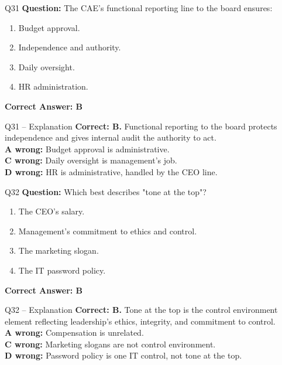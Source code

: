 \documentclass[aspectratio=169,10pt]{beamer}
\begin{document}
	\begin{frame}[t]{Q31}
		\small
		\textbf{Question:} The CAE's functional reporting line to the board ensures:
		\begin{enumerate}[label=\Alph*.,itemsep=1pt,topsep=2pt]
			\item Budget approval.
			\item Independence and authority.
			\item Daily oversight.
			\item HR administration.
		\end{enumerate}
		\vspace{4pt}
		\textbf{Correct Answer: B}
	\end{frame}
	
	\begin{frame}[t]{Q31 -- Explanation}
		\small
		\textbf{Correct: B.} Functional reporting to the board protects independence and gives internal audit the authority to act. \\[4pt]
		\textbf{A wrong:} Budget approval is administrative. \\[2pt]
		\textbf{C wrong:} Daily oversight is management's job. \\[2pt]
		\textbf{D wrong:} HR is administrative, handled by the CEO line.
	\end{frame}
	
	\begin{frame}[t]{Q32}
		\small
		\textbf{Question:} Which best describes "tone at the top"?
		\begin{enumerate}[label=\Alph*.,itemsep=1pt,topsep=2pt]
			\item The CEO's salary.
			\item Management's commitment to ethics and control.
			\item The marketing slogan.
			\item The IT password policy.
		\end{enumerate}
		\vspace{4pt}
		\textbf{Correct Answer: B}
	\end{frame}
	
	\begin{frame}[t]{Q32 -- Explanation}
		\small
		\textbf{Correct: B.} Tone at the top is the control environment element reflecting leadership's ethics, integrity, and commitment to control. \\[4pt]
		\textbf{A wrong:} Compensation is unrelated. \\[2pt]
		\textbf{C wrong:} Marketing slogans are not control environment. \\[2pt]
		\textbf{D wrong:} Password policy is one IT control, not tone at the top.
	\end{frame}
	
\end{document}
